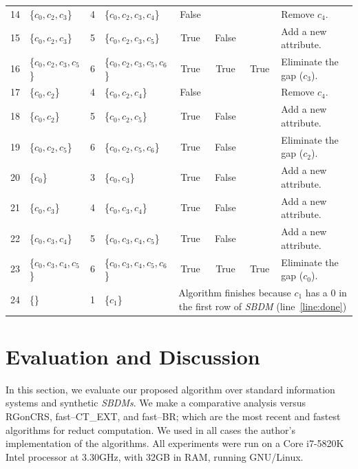 \documentclass[authoryear,preprint,review,12pt]{elsarticle}
\begin{document}
\begin{table}[!htb]
\begin{tabular}{|c|l|c|l|c|c|c|l|}
    		14 & \{$c_0,c_2,c_3$\} 		& 4 & \{$c_0,c_2,c_3,c_4$\}		& False &   &   & Remove $c_4$.\\
    		15 & \{$c_0,c_2,c_3$\}		& 5 & \{$c_0,c_2,c_3,c_5$\}		& True & False &   & Add a new attribute.\\
    		16 & \{$c_0,c_2,c_3,c_5$\}	& 6 & \{$c_0,c_2,c_3,c_5,c_6$\} 	& True & True & True & Eliminate the gap ($c_3$).\\
    		17 & \{$c_0,c_2$\} 			& 4 & \{$c_0,c_2,c_4$\}			& False &   &   & Remove $c_4$.\\
    		18 & \{$c_0,c_2$\}			& 5 & \{$c_0,c_2,c_5$\}			& True & False &   & Add a new attribute.\\
    		19 & \{$c_0,c_2,c_5$\}		& 6 & \{$c_0,c_2,c_5,c_6$\}		& True & False &   & Eliminate the gap ($c_2$).\\
    		20 & \{$c_0$\} 				& 3 & \{$c_0,c_3$\}				& True & False &   & Add a new attribute.\\    		
    		21 & \{$c_0,c_3$\}			& 4 & \{$c_0,c_3,c_4$\}			& True & False &   & Add a new attribute.\\
    		22 & \{$c_0,c_3,c_4$\}		& 5 & \{$c_0,c_3,c_4,c_5$\}		& True & False &   & Add a new attribute.\\
    		23 & \{$c_0,c_3,c_4,c_5$\}	& 6 & \{$c_0,c_3,c_4,c_5,c_6$\} 	& True & True & True & Eliminate the gap ($c_0$).\\
    		\hline
    		24 & \{\} 					& 1 & \{$c_1$\} 					& 
    		\multicolumn{4}{p{5cm}|}{Algorithm finishes because $c_1$ has a 0 in the first row of \textit{SBDM} (line~\ref{line:done})}\\
    		\hline
		\end{tabular}
	\end{table}
	
%
\section{Evaluation and Discussion}\label{evaluation}
	In this section, we evaluate our proposed algorithm over standard information systems \citep{Bache13} and synthetic \textit{SBDMs}. We make a comparative analysis versus RGonCRS, fast--CT\_EXT, and fast--BR; which are the most recent and fastest algorithms for reduct computation. We used in all cases the author's implementation of the algorithms. All experiments were run on a Core i7-5820K Intel processor at 3.30GHz, with 32GB in RAM, running GNU/Linux.
	
\end{document}
